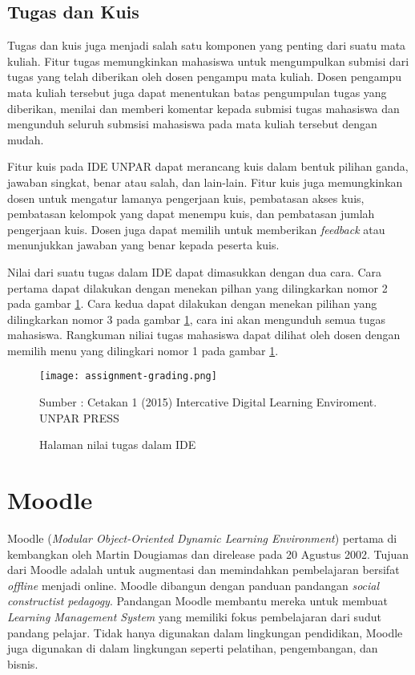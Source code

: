\subsection{Tugas dan Kuis}
Tugas dan kuis juga menjadi salah satu komponen yang penting dari suatu mata kuliah. Fitur tugas memungkinkan mahasiswa untuk mengumpulkan submisi dari tugas yang telah diberikan oleh dosen pengampu mata kuliah. Dosen pengampu mata kuliah tersebut juga dapat menentukan batas pengumpulan tugas yang diberikan, menilai dan memberi komentar kepada submisi tugas mahasiswa dan mengunduh seluruh submsisi mahasiswa pada mata kuliah tersebut dengan mudah.

Fitur kuis pada IDE UNPAR dapat merancang kuis dalam bentuk pilihan ganda, jawaban singkat, benar atau salah, dan lain-lain\cite{IDE:dasar-dasar}. Fitur kuis juga memungkinkan dosen untuk mengatur lamanya pengerjaan kuis, pembatasan akses kuis, pembatasan kelompok yang dapat menempu kuis, dan pembatasan jumlah pengerjaan kuis.  Dosen juga dapat memilih untuk memberikan \textit{feedback} atau menunjukkan jawaban yang benar kepada peserta kuis.

Nilai dari suatu tugas dalam IDE dapat dimasukkan dengan dua cara. Cara pertama dapat dilakukan dengan menekan pilhan yang dilingkarkan nomor 2 pada gambar \ref{fig:grading}. Cara kedua dapat dilakukan dengan menekan pilihan yang dilingkarkan nomor 3 pada gambar \ref{fig:grading}, cara ini akan mengunduh semua tugas mahasiswa. Rangkuman niliai tugas mahasiswa dapat dilihat oleh dosen dengan memilih menu yang dilingkari nomor 1 pada gambar \ref{fig:grading}.
\begin{figure} [ht]
	\centering  
	\texttt{[image: assignment-grading.png]}  
	\caption[Halaman nilai tugas dalam IDE] {Halaman nilai tugas dalam IDE} 
{Sumber : Cetakan 1 (2015) Intercative Digital Learning Enviroment. UNPAR PRESS}
	\label{fig:grading} 
\end{figure}
\section{Moodle}
\label{sec:Moodle}

Moodle (\textit{Modular Object-Oriented Dynamic Learning Environment}\cite{moodle:39}) pertama di kembangkan oleh Martin Dougiamas dan direlease pada 20 Agustus 2002\cite{moodle:39}. Tujuan dari Moodle adalah untuk augmentasi dan memindahkan pembelajaran bersifat \textit{offline} menjadi {online}. Moodle dibangun dengan panduan pandangan \textit{social constructist pedagogy}\cite{moodle:39}. Pandangan Moodle membantu mereka untuk membuat \textit{ Learning Management System} yang memiliki fokus pembelajaran dari sudut pandang pelajar. Tidak hanya digunakan dalam lingkungan pendidikan, Moodle juga digunakan di dalam lingkungan seperti pelatihan, pengembangan, dan bisnis.

